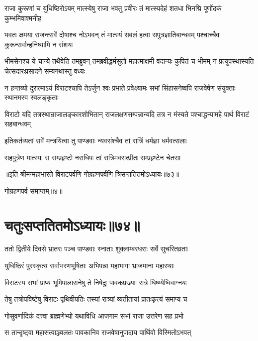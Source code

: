 \fourlineindentedshloka
{राजा कुरूणां च युधिष्ठिरोऽयम्}
{मात्स्येषु राजा भवतु प्रवीरः}
{तं मात्स्यदेहं शतधा भिनद्मि}
{पूर्णोदकं कुम्भमिवाश्मनीह}




\threelineshloka
{भवतः क्षमया राजन्त्सर्वे दोषाश्च नोऽभवन्}
{तं मात्स्यं सबलं हत्वा सपुत्रज्ञातिबान्धवम्}
{पश्चाच्चैव कुरून्सर्वान्हनिष्यामि न संशयः}


\onelineshloka
{भीमसेनश्च ये चान्ये तथैवेति तमब्रुवन्}
\twolineshloka
{तमब्रवीद्धर्मसुतो महात्माक्षमी वदान्यः कुपितं च भीमम्}
{न प्रत्युपस्थास्यति चेत्सदारःप्रसादने सम्यगथास्तु वध्यः}


\onelineshloka
{न हन्तव्यो दुरात्माऽयं विराटश्चापि तेऽर्जुन}
\twolineshloka
{श्वः प्रभाते प्रवेक्ष्यामः सभां सिंहासनेष्वपि}
{राजवेषेण संयुक्ताः स्थानमस्व स्वलङ्कृताः}


\threelineshloka
{विराटो यदि तत्रस्थान्राजालङ्कारशोभितान्}
{राजलक्षणसम्पन्नान्यदि तत्र न मंस्यते}
{पश्चाद्धन्यामहे पार्थ विराटं सहबान्धवम्}


\twolineshloka
{इतिकर्तव्यतां सर्वे मन्त्रयित्वा तु पाण्डवाः}
{न्यवसंश्चैव तां रात्रिं धर्मज्ञा धर्मवत्सलाः}


\twolineshloka
{सहपुत्रेण मात्स्यः स सम्प्रहृष्टो नराधिपः}
{तां रात्रिमवसत्प्रीतः सम्प्रहृष्टेन चेतसा}

॥इति श्रीमन्महाभारते विराटपर्वणि गोग्रहणपर्वणि त्रिसप्ततितमोऽध्यायः॥७३॥ 

गोग्रहणपर्व समाप्तम्॥४॥

\chapter{चतुःसप्ततितमोऽध्यायः॥७४॥}
\twolineshloka
{ततो द्वितीये दिवसे भ्रातरः पञ्च पाण्डवाः}
{स्नाताः शुक्लाम्बरधराः सर्वे सुचरितव्रताः}


\twolineshloka
{युधिष्ठिरं पुरस्कृत्य सर्वाभरणभूषिताः}
{अभिपन्ना महाभागा भ्राजमाना महारथाः}


\twolineshloka
{विराटस्य सभां प्राप्य भूमिपालासनेषु ते}
{निषेदुः पावकप्रख्याः सत्रे धिष्ण्येष्विवाग्नयः}


\twolineshloka
{तेषु तत्रोपविष्टेषु विराटः पृथिवीपतिः}
{तस्यां रात्र्यां व्यतीतायां प्रातःकृत्यं समाप्य च}


\twolineshloka
{गोसुवर्णादिकं दत्त्वा ब्राह्मणेभ्यो यथाविधि}
{आजगाम सभां राजा उत्तरेण सह प्रभो}


\twolineshloka
{स तान्दृष्ट्वा महासत्वाञ्ज्वलतः पावकानिव}
{राजवेषानुपादाय पार्थिवो विस्मितोऽभवत्}



